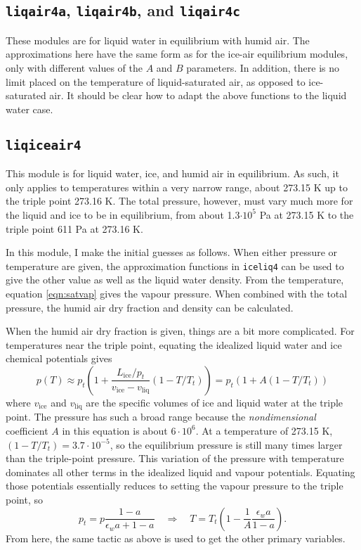 \documentclass{article}
\newcommand{\liq}{\text{liq}}
\newcommand{\ice}{\text{ice}}
\newcommand{\epsw}{\epsilon_w}
\begin{document}
\subsection{\texttt{liqair4a}, \texttt{liqair4b}, and \texttt{liqair4c}}

These modules are for liquid water in equilibrium with humid air. The approximations here have the same form as for the ice-air equilibrium modules, only with different values of the $A$ and $B$ parameters. In addition, there is no limit placed on the temperature of liquid-saturated air, as opposed to ice-saturated air. It should be clear how to adapt the above functions to the liquid water case.


\subsection{\texttt{liqiceair4}}

This module is for liquid water, ice, and humid air in equilibrium. As such, it only applies to temperatures within a very narrow range, about 273.15 K up to the triple point 273.16 K. The total pressure, however, must vary much more for the liquid and ice to be in equilibrium, from about 1.3$\cdot10^5$ Pa at 273.15 K to the triple point 611 Pa at 273.16 K.

In this module, I make the initial guesses as follows. When either pressure or temperature are given, the approximation functions in \texttt{iceliq4} can be used to give the other value as well as the liquid water density. From the temperature, equation \ref{eqn:satvap} gives the vapour pressure. When combined with the total pressure, the humid air dry fraction and density can be calculated.

When the humid air dry fraction is given, things are a bit more complicated. For temperatures near the triple point, equating the idealized liquid water and ice chemical potentials gives
\begin{equation*}
    p(T) \approx p_t \left( 1 + \frac{L_{\ice}/p_t}{v_{\ice} - v_{\liq}} (1 - T/T_t) \right) = p_t (1 + A (1 - T/T_t))
\end{equation*}
where $v_{\ice}$ and $v_{\liq}$ are the specific volumes of ice and liquid water at the triple point. The pressure has such a broad range because the \textit{nondimensional} coefficient $A$ in this equation is about $6\cdot10^6$. At a temperature of 273.15 K, $(1-T/T_t) = 3.7\cdot 10^{-5}$, so the equilibrium pressure is still many times larger than the triple-point pressure. This variation of the pressure with temperature dominates all other terms in the idealized liquid and vapour potentials. Equating those potentials essentially reduces to setting the vapour pressure to the triple point, so
\begin{equation*}
    p_t = p \frac{1-a}{\epsw a + 1-a} \quad \Rightarrow \quad T = T_t \left( 1 - \frac{1}{A} \frac{\epsw a}{1-a} \right).
\end{equation*}
From here, the same tactic as above is used to get the other primary variables.
\end{document}
